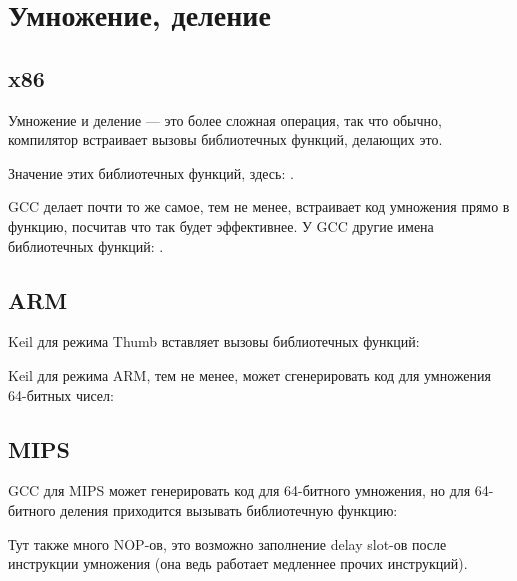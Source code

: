 ﻿\section{Умножение, деление}



\subsection{x86}



Умножение и деление --- это более сложная операция, так что обычно, компилятор встраивает вызовы библиотечных функций,
делающих это.

Значение этих библиотечных функций, здесь: .



GCC делает почти то же самое, тем не менее,
встраивает код умножения прямо в функцию, посчитав что так будет эффективнее.
У GCC другие имена библиотечных функций: .

\subsection{ARM}

Keil для режима Thumb вставляет вызовы библиотечных функций:



Keil для режима ARM, тем не менее, может сгенерировать код для умножения 64-битных чисел:




\subsection{MIPS}

\Optimizing GCC для MIPS может генерировать код для 64-битного умножения, но для 64-битного деления приходится вызывать библиотечную функцию:



Тут также много \ac{NOP}-ов, это возможно заполнение delay slot-ов после инструкции умножения (она ведь работает
медленнее прочих инструкций).

